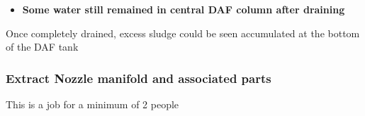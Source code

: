 \documentclass[
  12pt,
]{report}
\providecommand{\tightlist}{%
  \setlength{\itemsep}{0pt}\setlength{\parskip}{0pt}}\usepackage{longtable,booktabs,array}
\begin{document}
\begin{itemize}
\tightlist
\item
  \textbf{Some water still remained in central DAF column after
  draining}
\end{itemize}

{Once completely drained, excess sludge could be seen accumulated at the
bottom of the DAF tank}

\hypertarget{extract-nozzle-manifold-and-associated-parts}{%
\subsubsection{Extract Nozzle manifold and associated
parts}\label{extract-nozzle-manifold-and-associated-parts}}

{This is a job for a minimum of 2 people}
\end{document}
